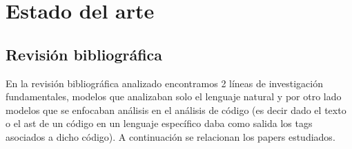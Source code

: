 \documentclass{article}
\begin{document}
\section{Estado del arte}

\subsection{Revisión bibliográfica}

En la revisión bibliográfica analizado encontramos 2 líneas de investigación fundamentales, modelos que analizaban solo
el lenguaje natural y por otro lado modelos que se enfocaban análisis en el análisis de código (es decir dado el texto o el ast
de un código en un lenguaje específico daba como salida los tags asociados a dicho código). A continuación se relacionan los 
papers estudiados.
\end{document}
